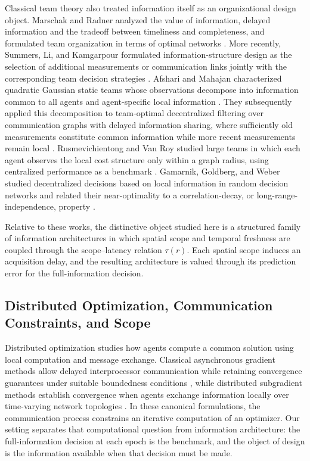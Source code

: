 \documentclass[11pt]{article}
\begin{document}
Classical team theory also treated information itself as an organizational design object. Marschak and Radner analyzed the value of information, delayed information and the tradeoff between timeliness and completeness, and formulated team organization in terms of optimal networks \cite{marschak1972economic}. More recently, Summers, Li, and Kamgarpour formulated information-structure design as the selection of additional measurements or communication links jointly with the corresponding team decision strategies \cite{summers2017information}. Afshari and Mahajan characterized quadratic Gaussian static teams whose observations decompose into information common to all agents and agent-specific local information \cite{afshari2017static}. They subsequently applied this decomposition to team-optimal decentralized filtering over communication graphs with delayed information sharing, where sufficiently old measurements constitute common information while more recent measurements remain local \cite{afshari2018team}. Rusmevichientong and Van Roy studied large teams in which each agent observes the local cost structure only within a graph radius, using centralized performance as a benchmark \cite{rusmevichientong2003decentralized}. Gamarnik, Goldberg, and Weber studied decentralized decisions based on local information in random decision networks and related their near-optimality to a correlation-decay, or long-range-independence, property \cite{gamarnik2014correlation}.

Relative to these works, the distinctive object studied here is a structured family of information architectures in which spatial scope and temporal freshness are coupled through the scope--latency relation $\tau(r)$. Each spatial scope induces an acquisition delay, and the resulting architecture is valued through its prediction error for the full-information decision. 

\subsection{Distributed Optimization, Communication Constraints, and Scope}
\label{subsec:related_distributed_control}

Distributed optimization studies how agents compute a common solution using local computation and message exchange. Classical asynchronous gradient methods allow delayed interprocessor communication while retaining convergence guarantees under suitable boundedness conditions \cite{tsitsiklis1986distributed}, while distributed subgradient methods establish convergence when agents exchange information locally over time-varying network topologies \cite{nedic2009distributed}. In these canonical formulations, the communication process constrains an iterative computation of an optimizer. Our setting separates that computational question from information architecture: the full-information decision at each epoch is the benchmark, and the object of design is the information available when that decision must be made.
\end{document}
